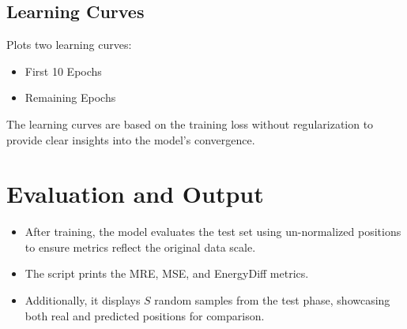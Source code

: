 \documentclass[a4paper,10pt]{article}
\begin{document}
\subsection{Learning Curves}
Plots two learning curves:
\begin{itemize}[leftmargin=*]
    \item First 10 Epochs
    \item Remaining Epochs
\end{itemize}
The learning curves are based on the training loss without regularization to provide clear insights into the model's convergence.

\section{Evaluation and Output}

\begin{itemize}[leftmargin=*]
    \item After training, the model evaluates the test set using un-normalized positions to ensure metrics reflect the original data scale.
    \item The script prints the MRE, MSE, and EnergyDiff metrics.
    \item Additionally, it displays \( S \) random samples from the test phase, showcasing both real and predicted positions for comparison.
\end{itemize}
\end{document}
